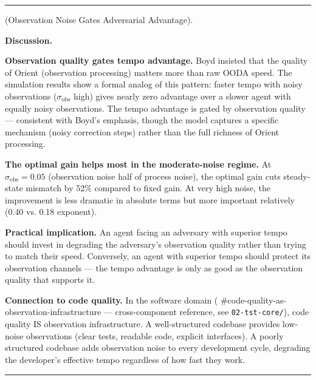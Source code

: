 \documentclass[11pt,oneside]{article}
\newcounter{claim}[section]
\renewcommand{\theclaim}{\thesection.\arabic{claim}}
\newenvironment{segment}[2]{%
  \refstepcounter{claim}%
  \bigskip\noindent\hrule\smallskip
  \noindent{\bfseries #1~\theclaim}\enskip(#2).\par\smallskip
  \noindent\ignorespaces
}{%
  \par\smallskip\noindent\hrule\bigskip
}
\newenvironment{observation}[1][]{\begin{segment}{Observation}{#1}}{\end{segment}}
\begin{document}
\begin{observation}[Observation Noise Gates Adversarial Advantage]
\medskip\noindent\textbf{Discussion.}


\textbf{Observation quality gates tempo advantage.} Boyd insisted that the quality of Orient (observation processing) matters more than raw OODA speed. The simulation results show a formal analog of this pattern: faster tempo with noisy observations ($\sigma_{\text{obs}}$ high) gives nearly zero advantage over a slower agent with equally noisy observations. The tempo advantage is gated by observation quality — consistent with Boyd's emphasis, though the model captures a specific mechanism (noisy correction steps) rather than the full richness of Orient processing.

\textbf{The optimal gain helps most in the moderate-noise regime.} At $\sigma_{\text{obs}} = 0.05$ (observation noise half of process noise), the optimal gain cuts steady-state mismatch by 52\% compared to fixed gain. At very high noise, the improvement is less dramatic in absolute terms but more important relatively (0.40 vs. 0.18 exponent).

\textbf{Practical implication.} An agent facing an adversary with superior tempo should invest in degrading the adversary's observation quality rather than trying to match their speed. Conversely, an agent with superior tempo should protect its observation channels — the tempo advantage is only as good as the observation quality that supports it.

\textbf{Connection to code quality.} In the software domain ( \#code-quality-as-observation-infrastructure — cross-component reference, see \texttt{02-tst-core/}), code quality IS observation infrastructure. A well-structured codebase provides low-noise observations (clear tests, readable code, explicit interfaces). A poorly structured codebase adds observation noise to every development cycle, degrading the developer's effective tempo regardless of how fast they work.

\end{observation}
\end{document}
